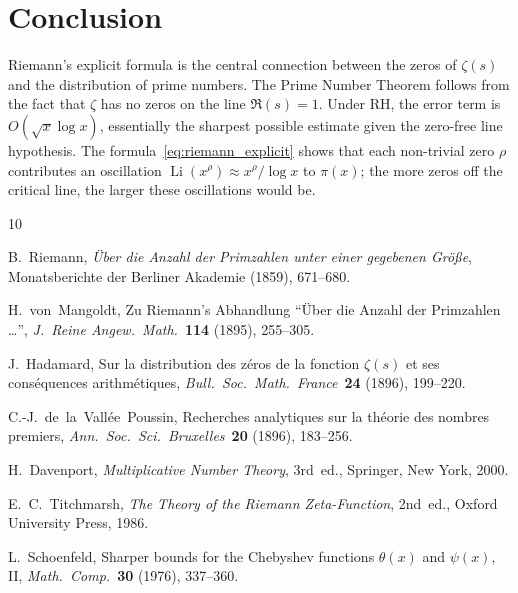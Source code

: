 \documentclass[12pt,a4paper]{amsart}
\theoremstyle{definition}
\DeclareMathOperator{\Li}{Li}
\begin{document}
\section{Conclusion}

Riemann's explicit formula is the central connection between the zeros
of $\zeta(s)$ and the distribution of prime numbers.
The Prime Number Theorem follows from the fact that $\zeta$ has no zeros
on the line $\Re(s) = 1$.
Under RH, the error term is $O(\sqrt{x}\log x)$,
essentially the sharpest possible estimate given the zero-free line hypothesis.
The formula~\eqref{eq:riemann_explicit} shows that each non-trivial zero
$\rho$ contributes an oscillation $\Li(x^\rho) \approx x^\rho/\log x$
to $\pi(x)$; the more zeros off the critical line, the larger these
oscillations would be.

\begin{thebibliography}{10}

B.~Riemann,
\emph{\"Uber die Anzahl der Primzahlen unter einer gegebenen Gr\"o\ss e},
Monatsberichte der Berliner Akademie (1859), 671--680.

H.~von~Mangoldt,
Zu Riemann's Abhandlung ``\"Uber die Anzahl der Primzahlen \ldots'',
\emph{J.\ Reine Angew.\ Math.}\ \textbf{114} (1895), 255--305.

J.~Hadamard,
Sur la distribution des z\'eros de la fonction $\zeta(s)$ et ses
cons\'equences arithm\'etiques,
\emph{Bull.\ Soc.\ Math.\ France}\ \textbf{24} (1896), 199--220.

C.-J.\ de~la~Vall\'ee~Poussin,
Recherches analytiques sur la th\'eorie des nombres premiers,
\emph{Ann.\ Soc.\ Sci.\ Bruxelles}\ \textbf{20} (1896), 183--256.

H.~Davenport,
\emph{Multiplicative Number Theory}, 3rd~ed.,
Springer, New York, 2000.

E.~C.~Titchmarsh,
\emph{The Theory of the Riemann Zeta-Function}, 2nd~ed.,
Oxford University Press, 1986.

L.~Schoenfeld,
Sharper bounds for the Chebyshev functions $\theta(x)$ and $\psi(x)$, II,
\emph{Math.\ Comp.}\ \textbf{30} (1976), 337--360.

\end{thebibliography}
\end{document}
